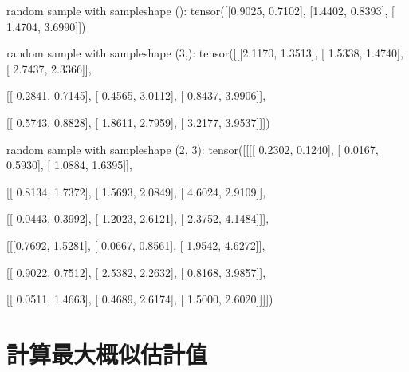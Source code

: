 \documentclass[letterpaper,10pt,english]{sphinxmanual}
\begin{document}
\begin{sphinxVerbatim}[commandchars=\\\{\}]
random sample with sample\PYGZus{}shape ():
 tensor([[\PYGZhy{}0.9025,  0.7102],
        [\PYGZhy{}1.4402,  0.8393],
        [ 1.4704,  3.6990]]) 

random sample with sample\PYGZus{}shape (3,):
 tensor([[[\PYGZhy{}2.1170,  1.3513],
         [ 1.5338,  1.4740],
         [ 2.7437,  2.3366]],

        [[ 0.2841,  0.7145],
         [ 0.4565,  3.0112],
         [ 0.8437,  3.9906]],

        [[ 0.5743,  0.8828],
         [ 1.8611,  2.7959],
         [ 3.2177,  3.9537]]]) 

random sample with sample\PYGZus{}shape (2, 3):
 tensor([[[[ 0.2302,  0.1240],
          [ 0.0167,  0.5930],
          [ 1.0884,  1.6395]],

         [[ 0.8134,  1.7372],
          [ 1.5693,  2.0849],
          [ 4.6024,  2.9109]],

         [[ 0.0443,  0.3992],
          [ 1.2023,  2.6121],
          [ 2.3752,  4.1484]]],


        [[[\PYGZhy{}0.7692,  1.5281],
          [ 0.0667,  0.8561],
          [ 1.9542,  4.6272]],

         [[ 0.9022,  0.7512],
          [ 2.5382,  2.2632],
          [ 0.8168,  3.9857]],

         [[ 0.0511,  1.4663],
          [ 0.4689,  2.6174],
          [ 1.5000,  2.6020]]]])
\end{sphinxVerbatim}


\section{計算最大概似估計值}
\label{\detokenize{notebook/lab-torch-mle:id1}}
\begin{sphinxVerbatim}[commandchars=\\\{\}]
  \PYG{p}{[}\PYG{p}{]}
  \PYG{p}{[}\PYG{p}{]}
  
  
\end{sphinxVerbatim}
\end{document}
